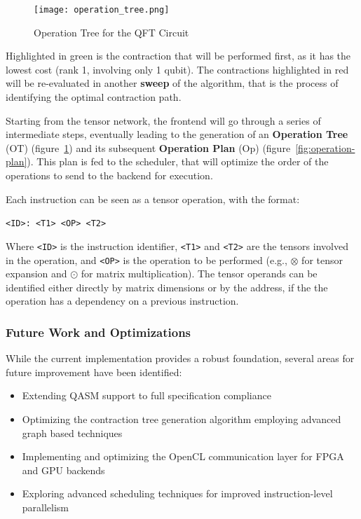 \documentclass[12pt,oneside,a4paper]{article}
\begin{document}
\begin{figure}
    \centering
    \texttt{[image: operation\_tree.png]}
    \caption{Operation Tree for the QFT Circuit}
    \label{fig:operation-tree}
\end{figure}

Highlighted in green is the contraction that will be performed first, as it has the lowest cost (rank 1, involving only 1 qubit). The contractions highlighted in red will be re-evaluated in another \textbf{sweep} of the algorithm, that is the process of identifying the optimal contraction path.

Starting from the tensor network, the frontend will go through a series of intermediate steps, eventually leading to the generation of an \textbf{Operation Tree} (OT) (figure~\ref{fig:operation-tree}) and its subsequent \textbf{Operation Plan} (Op) (figure~\ref{fig:operation-plan}). This plan is fed to the scheduler, that will optimize the order of the operations to send to the backend for execution.

Each instruction can be seen as a tensor operation, with the format:

\begin{center}
    \texttt{<ID>: <T1> <OP> <T2>}
\end{center}

Where \texttt{<ID>} is the instruction identifier, \texttt{<T1>} and \texttt{<T2>} are the tensors involved in the operation, and \texttt{<OP>} is the operation to be performed (e.g., $\otimes$ for tensor expansion and $\odot$ for matrix multiplication). The tensor operands can be identified either directly by matrix dimensions or by the address, if the the operation has a dependency on a previous instruction.

\FloatBarrier

\subsubsection{Future Work and Optimizations}

While the current implementation provides a robust foundation, several areas for future improvement have been identified:

\begin{itemize}
    \item Extending QASM support to full specification compliance
    \item Optimizing the contraction tree generation algorithm employing advanced graph based techniques \cite{PhysRevE}
    \item Implementing and optimizing the OpenCL communication layer for FPGA and GPU backends
    \item Exploring advanced scheduling techniques for improved instruction-level parallelism
\end{itemize}
\end{document}
